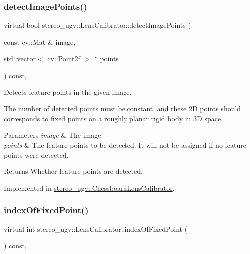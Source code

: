 \subsubsection{\texorpdfstring{detect\+Image\+Points()}{detectImagePoints()}}
{\footnotesize\ttfamily virtual bool stereo\+\_\+ugv\+::\+Lens\+Calibrator\+::detect\+Image\+Points (\begin{DoxyParamCaption}\item[{const cv\+::\+Mat \&}]{image,  }\item[{std\+::vector$<$ cv\+::\+Point2f $>$ $\ast$}]{points }\end{DoxyParamCaption}) const\hspace{0.3cm}{\ttfamily [protected]}, {}}



Detects feature points in the given image. 

The number of detected points must be constant, and these 2D points should corresponds to fixed points on a roughly planar rigid body in 3D space. 
\begin{DoxyParams}{Parameters}
{\em image} & The image. \\
\hline
{\em points} & The feature points to be detected. It will not be assigned if no feature points were detected. \\
\hline
\end{DoxyParams}
\begin{DoxyReturn}{Returns}
Whether feature points are detected. 
\end{DoxyReturn}


Implemented in \hyperlink{classstereo__ugv_1_1ChessboardLensCalibrator_ac6e93519a72d4218bcb1f9a49a9c22eb}{stereo\+\_\+ugv\+::\+Chessboard\+Lens\+Calibrator}.

\mbox{\label{classstereo__ugv_1_1LensCalibrator_ad25267d7b60a912f270701359eda1c54}} 
\subsubsection{\texorpdfstring{index\+Of\+Fixed\+Point()}{indexOfFixedPoint()}}
{\footnotesize\ttfamily virtual int stereo\+\_\+ugv\+::\+Lens\+Calibrator\+::index\+Of\+Fixed\+Point (\begin{DoxyParamCaption}{ }\end{DoxyParamCaption}) const\hspace{0.3cm}{\ttfamily [protected]}, {}}



